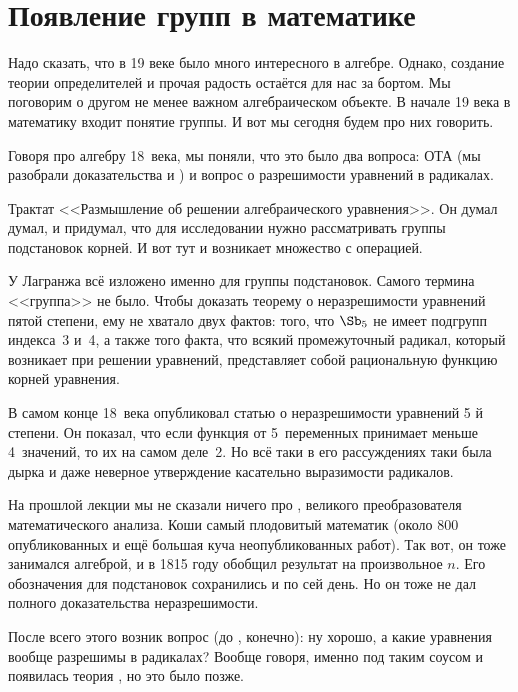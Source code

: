 \documentclass[a4paper,oneside,fleqn,10pt]{article}
\begin{document}

\section{Появление групп в математике}

Надо сказать, что в 19 веке было много интересного в алгебре.  Однако,
создание теории определителей и прочая радость остаётся для нас за
бортом.  Мы поговорим о другом не менее важном алгебраическом объекте.
В начале 19 века в математику входит понятие группы. И вот мы сегодня
будем про них говорить.

Говоря про алгебру 18~века, мы поняли, что это было два вопроса: ОТА
(мы разобрали доказательства  и
) и вопрос о разрешимости уравнений в
радикалах.

Трактат   <<Размышление об
решении алгебраического уравнения>>.  Он думал думал, и придумал, что
для исследовании нужно рассматривать группы подстановок корней. И вот
тут и возникает множество с операцией.

У Лагранжа всё изложено именно для группы подстановок. Самого термина
<<группа>> не было.  Чтобы доказать теорему о неразрешимости уравнений
пятой степени, ему не хватало двух фактов: того, что $\Sb_5$ не имеет
подгрупп индекса~3 и~4, а также того факта, что всякий промежуточный
радикал, который возникает при решении уравнений, представляет собой
рациональную функцию корней уравнения.

В самом конце 18~века 
опубликовал статью о неразрешимости уравнений 5 й степени. Он показал,
что если функция от 5~переменных принимает меньше 4~значений, то их на
самом деле~2. Но всё таки в его рассуждениях таки была дырка и даже
неверное утверждение касательно выразимости радикалов.

На прошлой лекции мы не сказали ничего про , великого
преобразователя математического анализа.  Коши самый плодовитый
математик (около 800 опубликованных и ещё большая куча
неопубликованных работ).  Так вот, он тоже занимался алгеброй, и в
1815 году обобщил результат  на произвольное $n$.  Его
обозначения для подстановок сохранились и по сей день. Но он тоже не
дал полного доказательства неразрешимости.

После всего этого возник вопрос (до , конечно): ну
хорошо, а какие уравнения вообще разрешимы в радикалах? Вообще говоря,
именно под таким соусом и появилась теория , но это было
позже.
\end{document}
